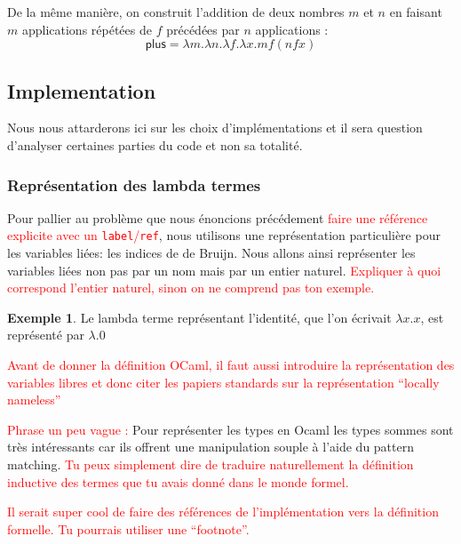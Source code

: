 \documentclass {article}
\newcommand{\codefrom}[3]
           {}
\theoremstyle{definition}
\newtheorem{example}{Exemple}
\theoremstyle{remark}
\newcommand{\todo}[1]{\textcolor{red}{#1}}
\begin{document}
De la même manière, on construit l'addition de deux nombres \(m\) et
\(n\) en faisant \(m\) applications répétées de \(f\) précédées par
\(n\) applications :
%
\[
\mathsf{plus} = \lambda m. \lambda n. \lambda f. \lambda x. m f (n f x)
\]


\subsection{Implementation}

Nous nous attarderons ici sur les choix d'implémentations et il sera question
d'analyser certaines parties du code et non sa totalité.

\subsubsection{Représentation des lambda termes}
 
Pour pallier au problème que nous énoncions précédement \todo{faire
  une référence explicite avec un \verb!label!/\verb!ref!}, nous
utilisons une représentation particulière pour les variables liées:
les indices de de Bruijn.  Nous allons ainsi représenter les variables
liées non pas par un nom mais par un entier naturel. \todo{Expliquer à
  quoi correspond l'entier naturel, sinon on ne comprend pas ton
  exemple.}

\begin{example}
  Le lambda terme représentant l'identité, que l'on écrivait \(\lambda x.x\), est représenté par \(\lambda.0\)
\end{example}

\todo{Avant de donner la définition OCaml, il faut aussi introduire la
  représentation des variables libres et donc citer les papiers
  standards sur la représentation ``locally nameless''}

\todo{Phrase un peu vague :} Pour représenter les types en Ocaml les
types sommes sont très intéressants car ils offrent une manipulation
souple à l'aide du pattern matching. \todo{Tu peux simplement dire de
  traduire naturellement la définition inductive des termes que tu
  avais donné dans le monde formel.}

\codefrom{untyped}{lambda}{untyped_term}

\todo{Il serait super cool de faire des références de l'implémentation
  vers la définition formelle. Tu pourrais utiliser une ``footnote''.}
\end{document}
